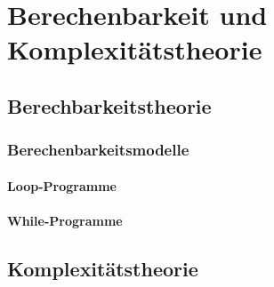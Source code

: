 \documentclass{lehramt-informatik-haupt}
\begin{document}

\chapter{Berechenbarkeit und Komplexitätstheorie}

\section{Berechbarkeitstheorie}

\begin{liQuellen}
\item \cite[Seite 253-340]{hoffmann}
\end{liQuellen}

\subsection{Berechenbarkeitsmodelle}

%

\subsubsection{Loop-Programme}

\begin{liQuellen}
\item \cite[Seite 7-11]{theo:fs:4}
\item \cite[Seite 254-260]{hoffmann}
\item \cite{wiki:loop}
\end{liQuellen}

%

\subsubsection{While-Programme}

\begin{liQuellen}
\item \cite[Seite 7-12]{theo:fs:4}
\item \cite[Seite 260-264]{hoffmann}
\item \cite{wiki:while}
\end{liQuellen}

%

\section{Komplexitätstheorie}
\end{document}
